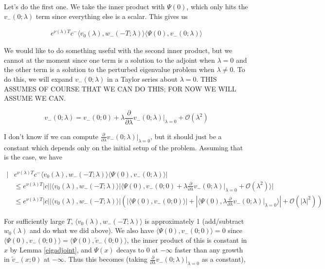 \documentclass[12pt]{article}
\begin{document}
\begin{enumerate}
Let's do the first one. We take the inner product with $\Psi(0)$, which only hits the $v_-(0; \lambda)$ term since everything else is a scalar. This gives us 

\begin{align*}
e^{\nu(\lambda)T} c^- \langle v_0(\lambda), w_-(-T; \lambda) \rangle \langle \Psi(0), v_-(0; \lambda) \rangle
\end{align*}

We would like to do something useful with the second inner product, but we cannot at the moment since one term is a solution to the adjoint when $\lambda = 0$ and the other term is a solution to the perturbed eigenvalue problem when $\lambda \neq 0$. To do this, we will expand $v_-(0; \lambda)$ in a Taylor series about $\lambda = 0$. THIS ASSUMES OF COURSE THAT WE CAN DO THIS; FOR NOW WE WILL ASSUME WE CAN.

\[
v_-(0; \lambda) = v_-(0; 0) + \lambda \frac{\partial}{\partial \lambda}v_-(0; \lambda)\Big|_{\lambda = 0} + \mathcal{O}(\lambda^2)
\]

I don't know if we can compute $\frac{\partial}{\partial \lambda}v_-(0; \lambda)\Big|_{\lambda = 0}$, but it should just be a constant which depends only on the initial setup of the problem. Assuming that is the case, we have 

\begin{align*}
|&e^{\nu(\lambda)T} c^- \langle v_0(\lambda), w_-(-T; \lambda) \rangle \langle \Psi(0), v_-(0; \lambda) \rangle|\\
&\leq e^{\nu(\lambda)T}|c| |\langle v_0(\lambda), w_-(-T; \lambda) \rangle|\langle \Psi(0), v_-(0; 0) + \lambda \frac{\partial}{\partial \lambda}v_-(0; \lambda)\Big|_{\lambda = 0} + \mathcal{O}(\lambda^2) \rangle| \\
&\leq e^{\nu(\lambda)T}|c| |\langle v_0(\lambda), w_-(-T; \lambda) \rangle| \left( |\langle \Psi(0), v_-(0; 0) \rangle| +  |\langle \Psi(0), \lambda \frac{\partial}{\partial \lambda}v_-(0; \lambda)\Big|_{\lambda = 0} \rangle| + \mathcal{O}(|\lambda|^2) \right)
\end{align*}

For sufficiently large $T$, $\langle v_0(\lambda), w_-(-T; \lambda) \rangle$ is approximately 1 (add/subtract $w_0(\lambda)$ and do what we did above). We also have $\langle \Psi(0), v_-(0; 0) \rangle = 0$ since $\langle \Psi(0), v_-(0; 0) \rangle = \langle \Psi(0), \tilde{v}_-(0; 0) \rangle$, the inner product of this is constant in $x$ by Lemma \ref{eigadjoint}, and $\Psi(x)$ decays to 0 at $-\infty$ faster than any growth in $\tilde{v}_-(x; 0)$ at $-\infty$. Thus this becomes (taking $\frac{\partial}{\partial \lambda}v_-(0; \lambda)\Big|_{\lambda = 0}$ as a constant),


\end{enumerate}
\end{document}

